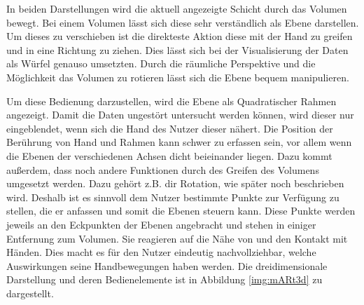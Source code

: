 In beiden Darstellungen wird die aktuell angezeigte Schicht durch das Volumen bewegt. Bei einem Volumen lässt sich diese sehr verständlich als Ebene darstellen. Um dieses zu verschieben ist die direkteste Aktion diese mit der Hand zu greifen und in eine Richtung zu ziehen. 
Dies lässt sich bei der Visualisierung der Daten als Würfel genauso umsetzten. Durch die räumliche Perspektive und die Möglichkeit das Volumen zu rotieren lässt sich die Ebene bequem manipulieren. 

Um diese Bedienung darzustellen, wird die Ebene als Quadratischer Rahmen angezeigt. Damit die Daten ungestört untersucht werden können, wird dieser nur eingeblendet, wenn sich die Hand des Nutzer dieser nähert. 
Die Position der Berührung von Hand und Rahmen kann schwer zu erfassen sein, vor allem wenn die Ebenen der verschiedenen Achsen dicht beieinander liegen. Dazu kommt außerdem, dass noch andere Funktionen durch des Greifen des Volumens umgesetzt werden. Dazu gehört z.B. dir Rotation, wie später noch beschrieben wird. Deshalb ist es sinnvoll dem Nutzer bestimmte Punkte zur Verfügung zu stellen, die er anfassen und somit die Ebenen steuern kann. Diese Punkte werden jeweils an den Eckpunkten der Ebenen angebracht und stehen in einiger Entfernung zum Volumen. Sie reagieren auf die Nähe von und den Kontakt mit Händen. Dies macht es für den Nutzer eindeutig nachvollziehbar, welche Auswirkungen seine Handbewegungen haben werden. 
Die dreidimensionale Darstellung und deren Bedienelemente ist in Abbildung \ref{img:mARt3d} zu dargestellt.

